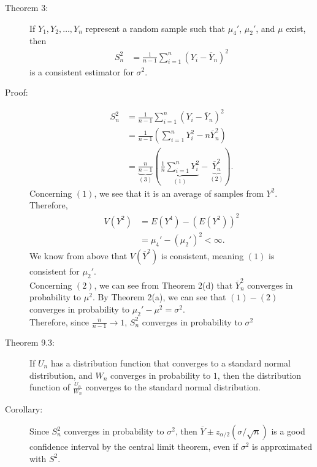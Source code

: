 \documentclass[10pt]{extarticle}
\begin{document}
  \begin{description}
    \item[Theorem 3:] If $Y_1,Y_2,\dots,Y_n$ represent a random sample such that $\mu_4'$, $\mu_2'$, and $\mu$ exist, then
      \begin{align*}
        S_n^2 &= \frac{1}{n-1}\sum_{i=1}^{n}(Y_i - \overline{Y}_n)^2
      \end{align*}
      is a consistent estimator for $\sigma^2$.
    \item[Proof:]
      \begin{align*}
        S_n^2 &= \frac{1}{n-1}\sum_{i=1}^{n}(Y_i - \overline{Y}_n)^2\\
              &= \frac{1}{n-1} \left(\sum_{i=1}^{n}Y_i^2 - n\overline{Y}_n^2\right)\\
              &= \underbrace{\frac{n}{n-1}}_{(3)}\left(\underbrace{\frac{1}{n}\sum_{i=1}^{n}Y_i^2}_{(1)} - \underbrace{\overline{Y}_n^2}_{(2)}\right).
      \end{align*}
      Concerning $(1)$, we see that it is an average of samples from $Y^2$. Therefore,
      \begin{align*}
        V(Y^2) &= E(Y^4) - (E(Y^2))^2\\
               &= \mu_4' - (\mu_2')^2 < \infty.
      \end{align*}
      We know from above that $V(\overline{Y}^2)$ is consistent, meaning $(1)$ is consistent for $\mu_2'$.\\

      Concerning $(2)$, we can see from Theorem 2(d) that $\overline{Y}_n^2$ converges in probability to $\mu^2$. By Theorem 2(a), we can see that $(1)-(2)$ converges in probability to $\mu_2'-\mu^2 = \sigma^2$.\\

      Therefore, since $\frac{n}{n-1}\rightarrow 1$, $S_n^2$ converges in probability to $\sigma^2$
    \item[Theorem 9.3:] If $U_n$ has a distribution function that converges to a standard normal distribution, and $W_n$ converges in probability to $1$, then the distribution function of $\frac{U_n}{W_n}$ converges to the standard normal distribution.
    \item[Corollary:] Since $S_n^2$ converges in probability to $\sigma^2$, then $\overline{Y} \pm z_{\alpha/2}(\sigma/\sqrt{n})$ is a good confidence interval by the central limit theorem, even if $\sigma^2$ is approximated with $S^2$.
  \end{description}
\end{document}
